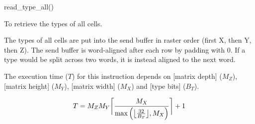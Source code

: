 

\format

read\_type\_all()

\purpose

To retrieve the types of all cells.

\description

The types of all cells are put into the send buffer in raster order (first X, then Y, then Z).
The send buffer is word-aligned after each row by padding with 0.
If a type would be split across two words, it is instead aligned to the next word.

\notes

The execution time ($T$) for this instruction depends on [matrix depth] ($M_Z$), [matrix height] ($M_Y$), [matrix width] ($M_X$) and [type bits] ($B_T$).

$$ T = M_Z M_Y \ceil[\bigg]{ \frac{M_X}{\max \left( \floor[\big]{ \frac{32}{B_T} }, M_X \right)} } + 1 $$
